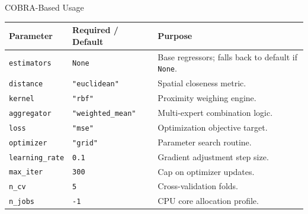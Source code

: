 \begin{frame}[t]{COBRA-Based Usage}
    \vspace{-0.5cm}
    \begin{table}
        \scriptsize
        \renewcommand{\arraystretch}{1.2}
        \setlength{\tabcolsep}{1.8pt}
        \begin{tabularx}{\textwidth}{
                >{\raggedright\arraybackslash}m{2.55cm}
                >{\raggedright\arraybackslash}m{2.55cm}
                >{\raggedright\arraybackslash}X}
            \toprule
            \textbf{Parameter}          &
            \textbf{Required / Default} &
            \textbf{Purpose}                                                                          \\
            \midrule
            \texttt{estimators}         &
            \texttt{None}               &
            Base regressors; falls back to default if \texttt{None}.                                  \\
            \texttt{distance}           & \texttt{"euclidean"}      & Spatial closeness metric.       \\
            \texttt{kernel}             & \texttt{"rbf"}            & Proximity weighing engine.      \\
            \texttt{aggregator}         & \texttt{"weighted\_mean"} & Multi-expert combination logic. \\
            \texttt{loss}               & \texttt{"mse"}            & Optimization objective target.  \\
            \texttt{optimizer}          & \texttt{"grid"}           & Parameter search routine.       \\
            \texttt{learning\_rate}     & \texttt{0.1}              & Gradient adjustment step size.  \\
            \texttt{max\_iter}          & \texttt{300}              & Cap on optimizer updates.       \\
            \texttt{n\_cv}              & \texttt{5}                & Cross-validation folds.         \\
            \texttt{n\_jobs}            & \texttt{-1}               & CPU core allocation profile.    \\
            \bottomrule
        \end{tabularx}
    \end{table}
\end{frame}

